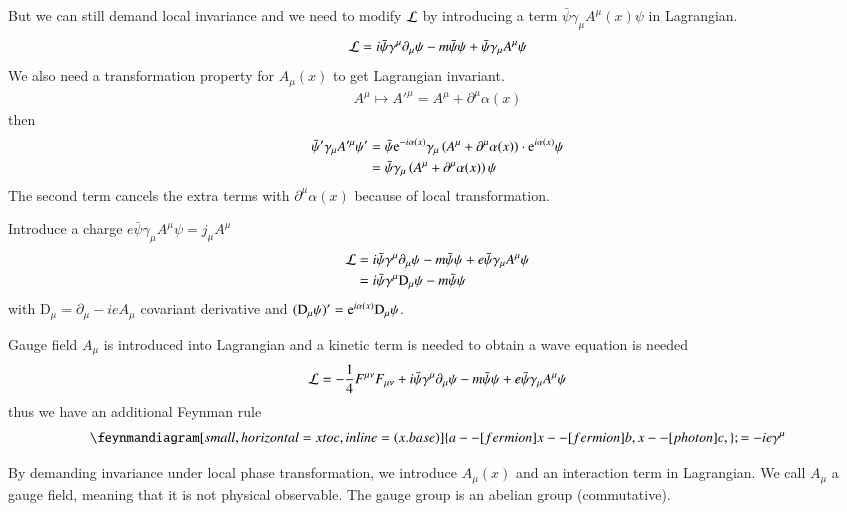 But we can still demand local invariance and we need to modify $\mathcal{L}$ by introducing a term $\bar{\psi} \gamma_\mu A^\mu(x) \psi$ in Lagrangian. 
\begin{align}
   \mathcal{L} = i \bar\psi \gamma^\mu \partial_\mu \psi - m \bar\psi \psi + \bar\psi \gamma_\mu A^\mu \psi
\end{align}
We also need a transformation property for $A_\mu(x)$ to get Lagrangian invariant.
\begin{align}
   A^\mu \mapsto A'^\mu = A^\mu + \partial^\mu \alpha(x)
\end{align}
then
\begin{align*}
   \bar\psi' \gamma_\mu A'^\mu \psi' &=  \bar{\psi} \mathrm{e}^{-i\alpha(x)} \gamma_\mu \left( A^\mu + \partial^\mu \alpha(x) \right) \cdot \mathrm{e}^{i\alpha(x)}\psi  \\
                     &= \bar{\psi} \gamma_\mu \left( A^\mu + \partial^\mu \alpha(x) \right) \psi 
\end{align*}
The second term cancels the extra terms with $\partial^\mu \alpha(x)$ because of local transformation.

Introduce a charge $e \bar\psi \gamma_\mu A^\mu \psi = j_\mu A^\mu$
\begin{align}
   \mathcal{L} &= i \bar\psi \gamma^\mu \partial_\mu \psi - m \bar\psi \psi + e \bar\psi \gamma_\mu A^\mu \psi \notag \\
        &= i \bar\psi \gamma^\mu \text{D}_\mu \psi - m \bar\psi \psi
\end{align}
with $\text{D}_\mu = \partial_\mu -ieA_\mu$ covariant derivative and $(\text{D}_\mu \psi)' = \mathrm{e}^{i\alpha(x)} \text{D}_\mu \psi$.

Gauge field $A_\mu$ is introduced into Lagrangian and a kinetic term is needed to obtain a wave equation is needed
\begin{align}
   \mathcal{L} &= -\frac{1}{4}F^{\mu\nu}F_{\mu\nu} +  i \bar\psi \gamma^\mu \partial_\mu \psi - m \bar\psi \psi + e \bar\psi \gamma_\mu A^\mu \psi \notag \\
\end{align}
thus we have an additional Feynman rule
\begin{align}
   \feynmandiagram[small, horizontal=x to c, inline=(x.base)]{ a --[fermion]x --[fermion]b, x --[photon] c,}; = -ie\gamma^\mu
\end{align}

By demanding invariance under local phase transformation, we introduce $A_\mu(x)$ and an interaction term in Lagrangian. We call $A_\mu$ a gauge field, meaning that it is not physical observable. The gauge group is an abelian group (commutative).

